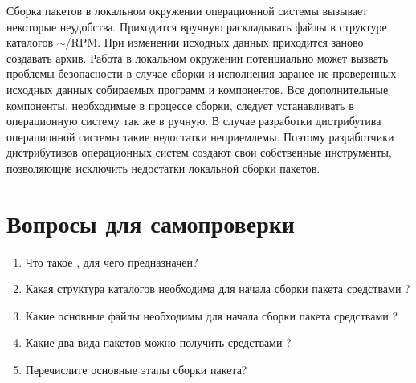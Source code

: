 Сборка пакетов в локальном окружении операционной системы вызывает некоторые неудобства.
Приходится вручную раскладывать файлы в структуре каталогов $\sim$/RPM. При изменении
исходных данных приходится заново создавать архив. Работа в локальном окружении потенциально
может вызвать проблемы безопасности в случае сборки и исполнения заранее не проверенных исходных
данных собираемых программ и компонентов. Все дополнительные компоненты, необходимые
в процессе сборки, следует устанавливать в операционную систему так же в ручную.
В случае разработки дистрибутива операционной системы такие недостатки неприемлемы.
Поэтому разработчики дистрибутивов операционных систем создают свои собственные инструменты,
позволяющие исключить недостатки локальной сборки пакетов.

\section{Вопросы для самопроверки}

\begin{enumerate}
	\item Что такое , для чего предназначен?
	\item Какая структура каталогов необходима для начала сборки пакета средствами ?
	\item Какие основные файлы необходимы для начала сборки пакета средствами ?
	\item Какие два вида пакетов можно получить средствами ?
	\item Перечислите основные этапы сборки пакета?
\end{enumerate}

